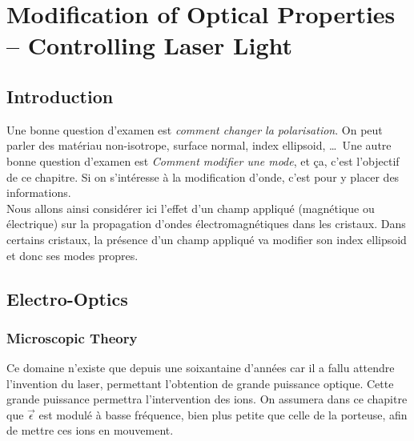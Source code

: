 \chapter{Modification of Optical Properties – Controlling Laser Light}
\section{Introduction}
Une bonne question d'examen est \textit{comment changer la polarisation}. On peut parler des matériau
non-isotrope, surface normal, index ellipsoid, \dots\ Une autre bonne question d'examen est 
\textit{Comment modifier une mode}, et ça, c'est l'objectif de ce chapitre. Si on s'intéresse à la
modification d'onde, c'est pour y placer des informations. \\

Nous allons ainsi considérer ici l'effet d'un champ appliqué (magnétique ou électrique) sur la propagation 
d'ondes électromagnétiques dans les cristaux. Dans certains cristaux, la présence d'un champ appliqué va
modifier son index ellipsoid et donc ses modes propres. 

\section{Electro-Optics}
\subsection{Microscopic Theory}
Ce domaine n'existe que depuis une soixantaine d'années car il a fallu attendre l'invention du laser, 
permettant l'obtention de grande puissance optique. Cette grande puissance permettra l'intervention des
ions. On assumera dans ce chapitre que $\vec{\epsilon}$ est modulé à basse fréquence, bien plus petite que celle
de la porteuse, afin de mettre ces ions en mouvement. \\

